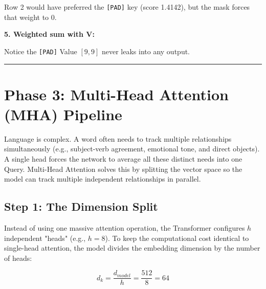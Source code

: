 \documentclass[11pt,a4paper,oneside]{report}
\begin{document}
Row 2 would have preferred the \texttt{{[}PAD{]}} key (score 1.4142), but the mask forces that weight to 0.

\textbf{5. Weighted sum with \(\mathbf{V}\):}

\begin{center}\end{center}

Notice the \texttt{{[}PAD{]}} Value \([9, 9]\) never leaks into any output.

\begin{center}\rule{0.5\linewidth}{0.5pt}\end{center}

\section{Phase 3: Multi-Head Attention (MHA) Pipeline}\label{phase-3-multi-head-attention-mha-pipeline}

Language is complex. A word often needs to track multiple relationships simultaneously (e.g., subject-verb agreement, emotional tone, and direct objects). A single head forces the network to average all these distinct needs into one Query. Multi-Head Attention solves this by splitting the vector space so the model can track multiple independent relationships in parallel.

\subsection{Step 1: The Dimension Split}\label{step-1-the-dimension-split}

Instead of using one massive attention operation, the Transformer configures \(h\) independent "heads" (e.g., \(h = 8\)). To keep the computational cost identical to single-head attention, the model divides the embedding dimension by the number of heads:

\[d_k = \frac{d_{model}}{h} = \frac{512}{8} = 64\]
\end{document}
